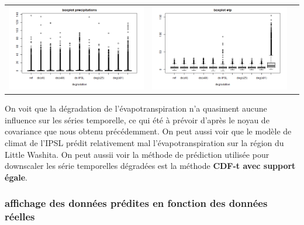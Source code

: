 \documentclass[a4paper,10pt]{article}
\begin{document}
\hspace{-1cm}
\begin{tabular}{ccc}
	\includegraphics[scale=0.4]{images/boxplot_precip.png} & \includegraphics[scale=0.4]{images/boxplot_evap.png}   \\
\end{tabular} 

On voit que la dégradation de l'évapotranspiration n'a quasiment aucune influence sur les séries temporelle, ce qui été à prévoir d'après le noyau de covariance que nous obtenu précédemment. On peut aussi voir que le modèle de climat de l'IPSL prédit relativement mal l'évapotranspiration sur la région du Little Washita. On peut aussii voir la méthode de prédiction utilisée pour downscaler les série temporelles dégradées est la méthode  \textbf{CDF-t avec support égale}. 

\subsubsection{affichage des données prédites en fonction des données réelles}
\end{document}
